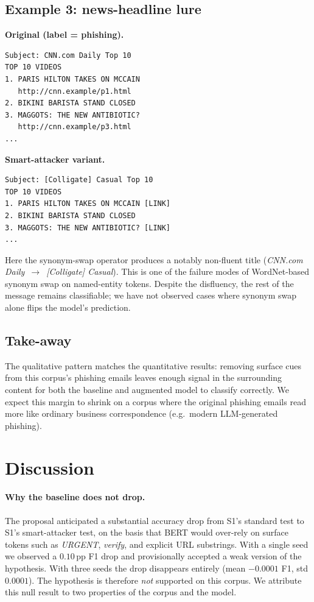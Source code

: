 \documentclass[conference]{IEEEtran}
\begin{document}
\subsection{Example 3: news-headline lure}

\noindent\textbf{Original (label = phishing).}
\begin{lstlisting}
Subject: CNN.com Daily Top 10
TOP 10 VIDEOS
1. PARIS HILTON TAKES ON MCCAIN
   http://cnn.example/p1.html
2. BIKINI BARISTA STAND CLOSED
3. MAGGOTS: THE NEW ANTIBIOTIC?
   http://cnn.example/p3.html
...
\end{lstlisting}
\noindent\textbf{Smart-attacker variant.}
\begin{lstlisting}
Subject: [Colligate] Casual Top 10
TOP 10 VIDEOS
1. PARIS HILTON TAKES ON MCCAIN [LINK]
2. BIKINI BARISTA STAND CLOSED
3. MAGGOTS: THE NEW ANTIBIOTIC? [LINK]
...
\end{lstlisting}

\noindent Here the synonym-swap operator produces a notably non-fluent
title (\textit{CNN.com Daily}~$\rightarrow$~\textit{[Colligate] Casual}).
This is one of the failure modes of WordNet-based synonym swap on
named-entity tokens. Despite the disfluency, the rest of the message
remains classifiable; we have not observed cases where synonym swap alone
flips the model's prediction.

\subsection{Take-away}

The qualitative pattern matches the quantitative results: removing
surface cues from this corpus's phishing emails leaves enough signal in
the surrounding content for both the baseline and augmented model to
classify correctly. We expect this margin to shrink on a corpus where the
original phishing emails read more like ordinary business correspondence
(e.g.\ modern LLM-generated phishing).

\section{Discussion}
\label{sec:discussion}

\paragraph{Why the baseline does not drop.} The proposal anticipated a
substantial accuracy drop from S1's standard test to S1's smart-attacker
test, on the basis that BERT would over-rely on surface tokens such as
\textit{URGENT}, \textit{verify}, and explicit URL substrings. With a
single seed we observed a $0.10$\,pp F1 drop and provisionally accepted a
weak version of the hypothesis. With three seeds the drop disappears
entirely (mean $-0.0001$ F1, std $0.0001$). The hypothesis is therefore
\emph{not} supported on this corpus. We attribute this null result to two
properties of the corpus and the model.
\end{document}

